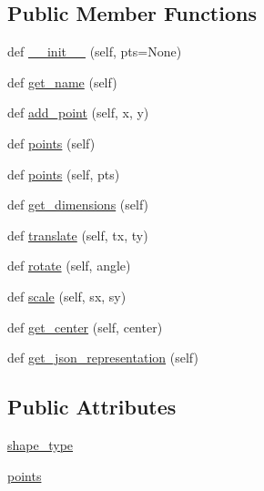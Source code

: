 \subsection*{Public Member Functions}
\begin{DoxyCompactItemize}
\item 
def \hyperlink{classbridges_1_1polyline_1_1_polyline_a536cf599bc221283c8e8d6df2324f23e}{\+\_\+\+\_\+init\+\_\+\+\_\+} (self, pts=None)
\item 
def \hyperlink{classbridges_1_1polyline_1_1_polyline_ac29d5a9cfe5fd60d97a32adef3a6b6bc}{get\+\_\+name} (self)
\item 
def \hyperlink{classbridges_1_1polyline_1_1_polyline_a0afbd2327d8dcba63809a6be07704753}{add\+\_\+point} (self, x, y)
\item 
def \hyperlink{classbridges_1_1polyline_1_1_polyline_ad1671a5857ad9e4010b7783b472c83fa}{points} (self)
\item 
def \hyperlink{classbridges_1_1polyline_1_1_polyline_ad543fcb38cb561b71d2ae2a9a88d9888}{points} (self, pts)
\item 
def \hyperlink{classbridges_1_1polyline_1_1_polyline_abc460c0169e1251e572642f8e968df05}{get\+\_\+dimensions} (self)
\item 
def \hyperlink{classbridges_1_1polyline_1_1_polyline_a654226c0de86aa0c6b9b5181a552cbfe}{translate} (self, tx, ty)
\item 
def \hyperlink{classbridges_1_1polyline_1_1_polyline_ab72d0a3cfdc4c3a7efec194f54f8a14a}{rotate} (self, angle)
\item 
def \hyperlink{classbridges_1_1polyline_1_1_polyline_a2727d3d6fa9da5ea738c51f822da16ae}{scale} (self, sx, sy)
\item 
def \hyperlink{classbridges_1_1polyline_1_1_polyline_a381cd78da11db3ce98fa87acd1d57449}{get\+\_\+center} (self, center)
\item 
def \hyperlink{classbridges_1_1polyline_1_1_polyline_a7f99e9e20c90068713b54ad64df3f193}{get\+\_\+json\+\_\+representation} (self)
\end{DoxyCompactItemize}
\subsection*{Public Attributes}
\begin{DoxyCompactItemize}
\item 
\hyperlink{classbridges_1_1polyline_1_1_polyline_a78459f0ed0614a7ab7c2d44de2f7439f}{shape\+\_\+type}
\item 
\hyperlink{classbridges_1_1polyline_1_1_polyline_a293b4edbc78100e08c4e6dec61a91327}{points}
\end{DoxyCompactItemize}


